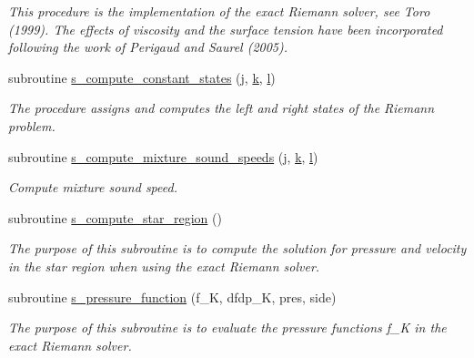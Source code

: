 \begin{DoxyCompactItemize}
\begin{DoxyCompactList}\small\item\em This procedure is the implementation of the exact Riemann solver, see Toro (1999). The effects of viscosity and the surface tension have been incorporated following the work of Perigaud and Saurel (2005). \end{DoxyCompactList}\item 
subroutine \hyperlink{namespacem__riemann__solvers_a16383eccdd2d0ecca7d1c26467daaaab}{s\+\_\+compute\+\_\+constant\+\_\+states} (\hyperlink{m__rhs_8f90_aeadbc0ce9b66517f8fde156199772ec1}{j}, \hyperlink{m__rhs_8f90_af22c486581933c52df7d4aa306382074}{k}, \hyperlink{m__rhs_8f90_a2ac747380de0e6e5e11b01f4137fb75c}{l})
\begin{DoxyCompactList}\small\item\em The procedure assigns and computes the left and right states of the Riemann problem. \end{DoxyCompactList}\item 
subroutine \hyperlink{namespacem__riemann__solvers_a16d6f8f4c3ad64fdb574a50c189750c5}{s\+\_\+compute\+\_\+mixture\+\_\+sound\+\_\+speeds} (\hyperlink{m__rhs_8f90_aeadbc0ce9b66517f8fde156199772ec1}{j}, \hyperlink{m__rhs_8f90_af22c486581933c52df7d4aa306382074}{k}, \hyperlink{m__rhs_8f90_a2ac747380de0e6e5e11b01f4137fb75c}{l})
\begin{DoxyCompactList}\small\item\em Compute mixture sound speed. \end{DoxyCompactList}\item 
subroutine \hyperlink{namespacem__riemann__solvers_a947bc1c7da743ee0820ff6648fef3c25}{s\+\_\+compute\+\_\+star\+\_\+region} ()
\begin{DoxyCompactList}\small\item\em The purpose of this subroutine is to compute the solution for pressure and velocity in the star region when using the exact Riemann solver. \end{DoxyCompactList}\item 
subroutine \hyperlink{namespacem__riemann__solvers_aba768ee53f47327a70508a913b55254d}{s\+\_\+pressure\+\_\+function} (f\+\_\+K, dfdp\+\_\+K, pres, side)
\begin{DoxyCompactList}\small\item\em The purpose of this subroutine is to evaluate the pressure functions f\+\_\+K in the exact Riemann solver. \end{DoxyCompactList}\item 

\end{DoxyCompactItemize}
